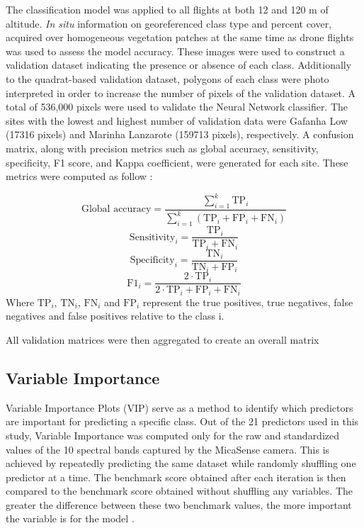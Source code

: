 \documentclass[
  number]{elsarticle}
\begin{document}
The classification model was applied to all flights at both 12 and 120 m
of altitude. \emph{In situ} information on georeferenced class type and
percent cover, acquired over homogeneous vegetation patches at the same
time as drone flights was used to assess the model accuracy. These
images were used to construct a validation dataset indicating the
presence or absence of each class. Additionally to the quadrat-based
validation dataset, polygons of each class were photo interpreted in
order to increase the number of pixels of the validation dataset. A
total of 536,000 pixels were used to validate the Neural Network
classifier. The sites with the lowest and highest number of validation
data were Gafanha Low (17316 pixels) and Marinha Lanzarote (159713
pixels), respectively. A confusion matrix, along with precision metrics
such as global accuracy, sensitivity, specificity, F1 score, and Kappa
coefficient, were generated for each site. These metrics were computed
as follow :

\[
\text{Global accuracy} = \frac{\sum_{i=1}^{k} \text{TP}_i}{\sum_{i=1}^{k} \left(\text{TP}_i + \text{FP}_i + \text{FN}_i \right)}
\] \[
\text{Sensitivity}_i = \frac{\text{TP}_i}{\text{TP}_i + \text{FN}_i}
\] \[
\text{Specificity}_i = \frac{\text{TN}_i}{\text{TN}_i + \text{FP}_i}
\] \[
\text{F1}_i = \frac{2 \cdot \text{TP}_i}{2 \cdot \text{TP}_i + \text{FP}_i + \text{FN}_i}
\] Where \(\text{TP}_i\), \(\text{TN}_i\), \(\text{FN}_i\) and
\(\text{FP}_i\) represent the true positives, true negatives, false
negatives and false positives relative to the class i.

All validation matrices were then aggregated to create an overall matrix

\subsection{Variable Importance}\label{variable-importance}

Variable Importance Plots (VIP) serve as a method to identify which
predictors are important for predicting a specific class. Out of the 21
predictors used in this study, Variable Importance was computed only for
the raw and standardized values of the 10 spectral bands captured by the
MicaSense camera. This is achieved by repeatedly predicting the same
dataset while randomly shuffling one predictor at a time. The benchmark
score obtained after each iteration is then compared to the benchmark
score obtained without shuffling any variables. The greater the
difference between these two benchmark values, the more important the
variable is for the model \citep{WEI2015399}.
\end{document}
